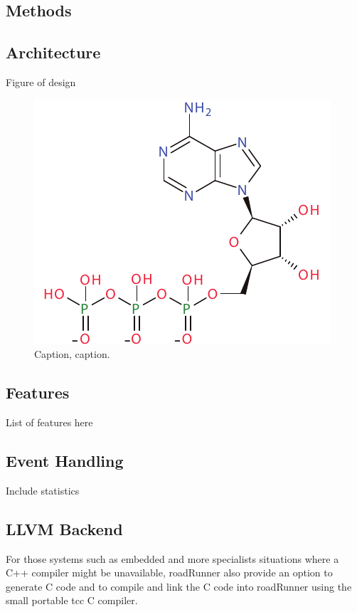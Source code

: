 \documentclass{bioinfo}
\begin{document}
\begin{methods}
\section{Methods}

\subsection{Architecture}

Figure of design

\begin{figure}[!tpb]%
\centerline{\includegraphics[scale=0.7]{atp.pdf}}
\caption{Caption, caption.}\label{fig:02}
\end{figure}

\subsection{Features}

List of features here

\subsection{Event Handling}

Include statistics

\subsection{LLVM Backend}

For those systems such as embedded and more specialists situations where a C++ compiler might be unavailable, roadRunner also provide an option to generate C code and to compile and link the C code into roadRunner using the small portable tcc C compiler.



\end{methods}
\end{document}

